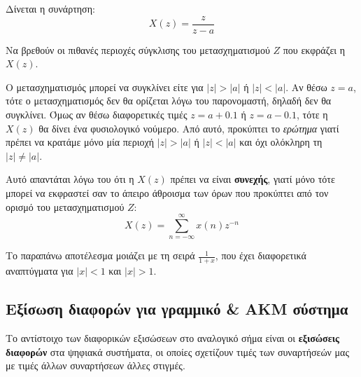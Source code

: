 \documentclass[11pt,a4paper,notitlepage,fleqn,draft]{article}
\begin{document}

\begin{exercise}
	Δίνεται η συνάρτηση:
	\[
	X(z) = \frac{z}{z-a}
	\]
	
	Να βρεθούν οι πιθανές περιοχές σύγκλισης του μετασχηματισμού \( Z \) που εκφράζει η \( X(z) \).
	\tcblower
	
	\saveparinfo
	\begin{minipage}{.7\textwidth}
		\useparinfo
	Ο μετασχηματισμός μπορεί να συγκλίνει είτε για \( |z|>|a| \) ή \( |z|<|a| \). Αν θέσω
	\( z=a \), τότε ο μετασχηματισμός δεν θα ορίζεται λόγω του παρονομαστή, δηλαδή δεν θα συγκλίνει.
	Όμως αν θέσω διαφορετικές τιμές \( z=a+0.1 \) ή \( z=a-0.1 \), τότε η \( X(z) \) θα δίνει ένα
	φυσιολογικό νούμερο. Από αυτό, προκύπτει το \emph{ερώτημα} γιατί πρέπει να κρατάμε μόνο μία περιοχή
	\( |z|>|a| \) ή \( |z|<|a| \) και όχι ολόκληρη τη \( |z|\neq|a| \).
\end{minipage}
	\begin{minipage}{.3\textwidth}
		\begin{center}
		\end{center}
	\end{minipage}
	
	Αυτό απαντάται λόγω του ότι η \( X(z) \) πρέπει να είναι \textbf{συνεχής}, γιατί μόνο τότε
	μπορεί να εκφραστεί σαν το άπειρο άθροισμα των όρων που προκύπτει από τον ορισμό του
	μετασχηματισμού \( Z \):\[
	X(z) = \sum_{n=-\infty}^{\infty} x(n)z^{-n}
	\]
	
	Το παραπάνω αποτέλεσμα μοιάζει με τη σειρά \( \frac{1}{1+x} \), που έχει διαφορετικά αναπτύγματα για
	\( |x|<1 \) και \( |x|>1 \).
\end{exercise}

\subsection{Εξίσωση διαφορών για γραμμικό \& ΑΚΜ σύστημα}
Το αντίστοιχο των διαφορικών εξισώσεων στο αναλογικό σήμα είναι οι \textbf{εξισώσεις διαφορών} στα
ψηφιακά συστήματα, οι οποίες σχετίζουν τιμές των συναρτήσεών μας με τιμές άλλων συναρτήσεων άλλες στιγμές.
\end{document}
